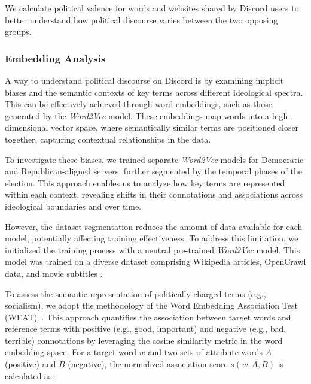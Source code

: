 
We calculate political valence for words and websites shared by Discord users to better understand how political discourse varies between the two opposing groups.


\subsubsection{Embedding Analysis}

\label{sec:embeddings}
A way to understand political discourse on Discord is by examining implicit biases and the semantic contexts of key terms across different ideological spectra. This can be effectively achieved through word embeddings, such as those generated by the \textit{Word2Vec} model\cite{mikolov2013efficient,mikolov2013distributed}. These embeddings map words into a high-dimensional vector space, where semantically similar terms are positioned closer together, capturing contextual relationships in the data.

To investigate these biases, we trained separate \textit{Word2Vec} models for Democratic- and Republican-aligned servers, further segmented by the temporal phases of the election. This approach enables us to analyze how key terms are represented within each context, revealing shifts in their connotations and associations across ideological boundaries and over time. 

However, the dataset segmentation reduces the amount of data available for each model, potentially affecting training effectiveness. To address this limitation, we initialized the training process with a neutral pre-trained \textit{Word2Vec} model. This model was trained on a diverse dataset comprising Wikipedia articles, OpenCrawl data, and movie subtitles \cite{speer2017conceptnet}. 
 
To assess the semantic representation of politically charged terms (e.g., socialism), we adopt the methodology of the Word Embedding Association Test (WEAT)~\cite{caliskan2017semantics}. This approach quantifies the association between target words and reference terms with positive (e.g., good, important) and negative (e.g., bad, terrible) connotations by leveraging the cosine similarity metric in the word embedding space. For a target word \( w \) and two sets of attribute words \( A \) (positive) and \( B \) (negative), the normalized association score \( s(w, A, B) \) is calculated as:


